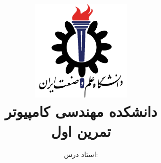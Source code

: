\title{
    \center
    \includegraphics[width=5cm, height=5cm]{images/IUST_logo_color.png} \\
    دانشکده مهندسی کامپیوتر \\[25pt]     
تمرین اول \\
\CourseName
}

\author{
    استاد درس:
    \Instructor \\[25pt]
}
\date{\Semester}